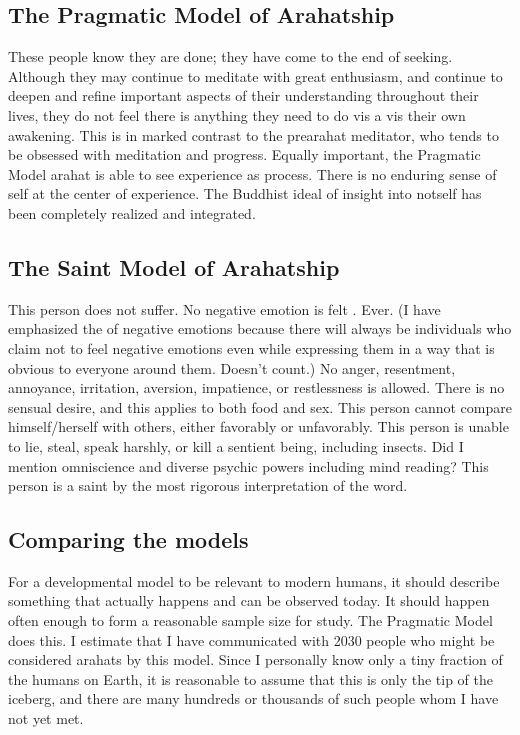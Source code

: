 \documentclass[a5paper,10pt,english]{book}
\begin{document}
\subsection{The Pragmatic Model of Arahatship}
\label{\detokenize{main-2:the-pragmatic-model-of-arahatship}}
\sphinxAtStartPar
These people know they are done; they have come to the end of seeking.
Although they may continue to meditate with great enthusiasm, and
continue to deepen and refine important aspects of their understanding
throughout their lives, they do not feel there is anything they need to
do vis a vis their own awakening. This is in marked contrast to the
pre\sphinxhyphen{}arahat meditator, who tends to be obsessed with meditation and
progress. Equally important, the Pragmatic Model arahat is able to see
experience as process. There is no enduring sense of self at the center
of experience. The Buddhist ideal of insight into not\sphinxhyphen{}self has been
completely realized and integrated.


\subsection{The Saint Model of Arahatship}
\label{\detokenize{main-2:the-saint-model-of-arahatship}}
\sphinxAtStartPar
This person does not suffer. No negative emotion is felt .
Ever. (I have emphasized the  of negative emotions because
there will always be individuals who claim not to feel negative emotions
even while expressing them in a way that is obvious to everyone around
them. Doesn’t count.) No anger, resentment, annoyance, irritation,
aversion, impatience, or restlessness is allowed. There is no sensual
desire, and this applies to both food and sex. This person cannot
compare himself/herself with others, either favorably or unfavorably.
This person is unable to lie, steal, speak harshly, or kill a sentient
being, including insects. Did I mention omniscience and diverse psychic
powers including mind reading? This person is a saint by the most
rigorous interpretation of the word.


\subsection{Comparing the models}
\label{\detokenize{main-2:comparing-the-models}}
\sphinxAtStartPar
For a developmental model to be relevant to modern humans, it should
describe something that actually happens and can be observed today. It
should happen often enough to form a reasonable sample size for study.
The Pragmatic Model does this. I estimate that I have communicated with
20\sphinxhyphen{}30 people who might be considered arahats by this model. Since I
personally know only a tiny fraction of the humans on Earth, it is
reasonable to assume that this is only the tip of the iceberg, and there
are many hundreds or thousands of such people whom I have not yet met.
\end{document}
